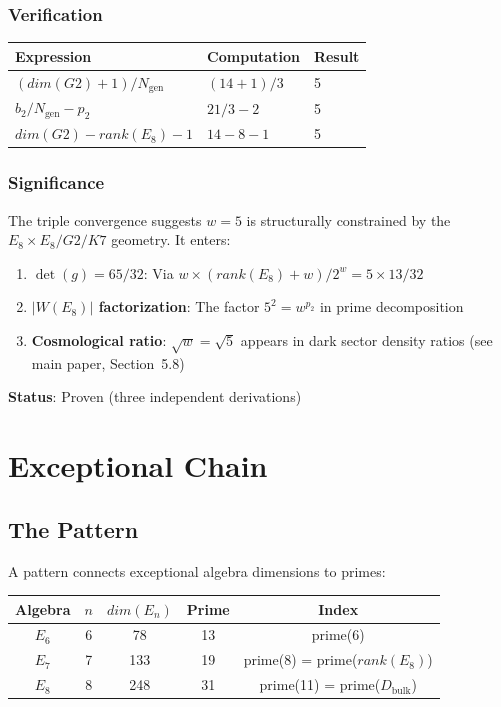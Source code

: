 \documentclass[11pt,a4paper]{article}
\newcommand{\E}{\mathrm{E}}
\newcommand{\Gtwo}{\mathrm{G}_2}
\newcommand{\Kseven}{K_7}
\newcommand{\dimE}{\mathrm{dim}}
\newcommand{\rk}{\mathrm{rank}}
\newcommand{\proven}{\textsc{Proven}}
\def\Gtwo{G2}%
\def\Kseven{K7}%
\def\E{E}%
\def\dimE{dim}%
\def\rk{rank}%
\def\proven{Proven}%
\begin{document}
\subsubsection{Verification}

\begin{table}[H]
\centering
\begin{tabular}{lll}
\toprule
Expression & Computation & Result \\
\midrule
$(\dimE(\Gtwo) + 1) / N_{\mathrm{gen}}$ & $(14 + 1) / 3$ & 5 \\
$b_2/N_{\mathrm{gen}} - p_2$ & $21/3 - 2$ & 5 \\
$\dimE(\Gtwo) - \rk(\E_8) - 1$ & $14 - 8 - 1$ & 5 \\
\bottomrule
\end{tabular}
\end{table}

\subsubsection{Significance}

The triple convergence suggests $w = 5$ is structurally constrained by the $\E_8 \times \E_8/\Gtwo/\Kseven$ geometry. It enters:

\begin{enumerate}
\item \textbf{$\det(g) = 65/32$}: Via $w \times (\rk(\E_8) + w) / 2^w = 5 \times 13 / 32$
\item \textbf{$|W(\E_8)|$ factorization}: The factor $5^2 = w^{p_2}$ in prime decomposition
\item \textbf{Cosmological ratio}: $\sqrt{w} = \sqrt{5}$ appears in dark sector density ratios (see main paper, Section~5.8)
\end{enumerate}

\textbf{Status}: \proven{} (three independent derivations)

\section{Exceptional Chain}

\subsection{The Pattern}

A pattern connects exceptional algebra dimensions to primes:

\begin{table}[H]
\centering
\begin{tabular}{ccccc}
\toprule
Algebra & $n$ & $\dimE(\E_n)$ & Prime & Index \\
\midrule
$\E_6$ & 6 & 78 & 13 & prime(6) \\
$\E_7$ & 7 & 133 & 19 & prime(8) = prime($\rk(\E_8)$) \\
$\E_8$ & 8 & 248 & 31 & prime(11) = prime($D_{\text{bulk}}$) \\
\bottomrule
\end{tabular}
\end{table}
\end{document}
